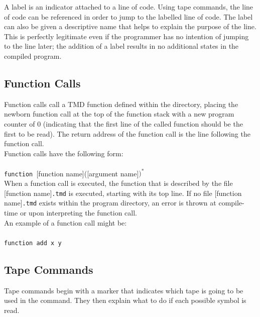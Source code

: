 \documentclass[11pt]{article}
\begin{document}
A label is an indicator attached to a line of code. Using tape commands, the line of code can be referenced in order to jump to the labelled line of code. The label can also be given a descriptive name that helps to explain the purpose of the line. This is perfectly legitimate even if the programmer has no intention of jumping to the line later; the addition of a label results in no additional states in the compiled program.

\subsection{Function Calls}

Function calls call a TMD function defined within the directory, placing the newborn function call at the top of the function stack with a new program counter of 0 (indicating that the first line of the called function should be the first to be read). The return address of the function call is the line following the function call. \\

Function calls have the following form: \\ \\
\texttt{function }[function name]([argument name]$)^*$ \\

When a function call is executed, the function that is described by the file [function name]\texttt{.tmd} is executed, starting with its top line. If no file [function name]\texttt{.tmd} exists within the program directory, an error is thrown at compile-time or upon interpreting the function call. \\ 

An example of a function call might be: \\ \\
\texttt{function add x y}

\subsection{Tape Commands}

Tape commands begin with a marker that indicates which tape is going to be used in the command. They then explain what to do if each possible symbol is read.
\end{document}
